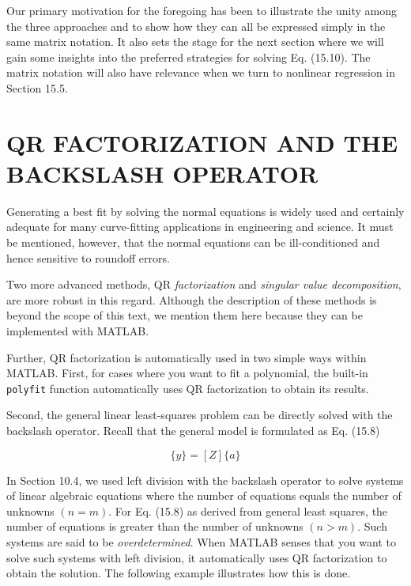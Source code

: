 \documentclass[../main.tex]{subfiles}
\begin{document}
Our primary motivation for the foregoing has been to illustrate the unity among the
three approaches and to show how they can all be expressed simply in the same matrix notation. It also sets the stage for the next section where we will gain some insights into the
preferred strategies for solving Eq. (15.10). The matrix notation will also have relevance
when we turn to nonlinear regression in Section 15.5.

\bigskip
\label{cha:cha_P_15_4} %
\section{QR FACTORIZATION AND THE BACKSLASH OPERATOR}

\noindent Generating a best fit by solving the normal equations is widely used and certainly adequate
for many curve-fitting applications in engineering and science. 
It must be mentioned, however, that the normal equations can be ill-conditioned and hence sensitive to roundoff errors.

Two more advanced methods, QR \textit{factorization} and \textit{singular value decomposition}, are
more robust in this regard. Although the description of these methods is beyond the scope
of this text, we mention them here because they can be implemented with MATLAB.

Further, QR factorization is automatically used in two simple ways within MATLAB.
First, for cases where you want to fit a polynomial, the built-in \texttt{polyfit} function automatically uses QR factorization to obtain its results.

Second, the general linear least-squares problem can be directly solved with the backslash operator. Recall that the general model is formulated as Eq. (15.8)

\begin{equation}
	\tag{15.11}
	\{y\} = [Z] \{a\}
\end{equation}

In Section 10.4, we used left division with the backslash operator to solve systems of linear algebraic equations where the number of equations equals the number of unknowns $(n = m)$.
For Eq. (15.8) as derived from general least squares, the number of equations is greater than
the number of unknowns $(n > m)$. Such systems are said to be \textit{overdetermined}. When
MATLAB senses that you want to solve such systems with left division, it automatically uses
QR factorization to obtain the solution. The following example illustrates how this is done.
\end{document}

